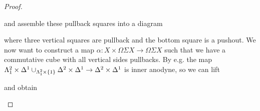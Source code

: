 \begin{lemma}
\begin{proof}
        \begin{center}
        \end{center}
        and assemble these pullback squares into a diagram
        \begin{center}
        \end{center}
        where three vertical squares are pullback and the bottom square is a pushout.
        We now want to construct a map $\alpha\colon X\times\Omega\Sigma X\to\Omega\Sigma X$ such that we have a commutative cube with all vertical sides pullbacks.
        By e.g. \cite[Lemma 1.4.7.5]{kerodon} the map $\Lambda_1^2\times\Delta^1\cup_{\Lambda_1^2\times\left\lbrace1\right\rbrace}\Delta^2\times\Delta^1\to\Delta^2\times\Delta^1$ is inner anodyne, so we can lift
        \begin{center}
        \end{center}
        and obtain 
        \begin{center}
\end{center}
\end{proof}
\end{lemma}
